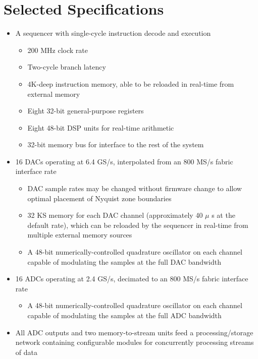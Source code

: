 \section{Selected Specifications}

\begin{itemize}

    \item A sequencer with single-cycle instruction decode and execution
    \begin{itemize}
        \item 200 MHz clock rate
        \item Two-cycle branch latency
        \item 4K-deep instruction memory, able to be reloaded in real-time from external memory
        \item Eight 32-bit general-purpose registers
        \item Eight 48-bit DSP units for real-time arithmetic
        \item 32-bit memory bus for interface to the rest of the system
    \end{itemize}

    \item 16 DACs operating at 6.4 GS/s, interpolated from an 800 MS/s fabric interface rate
    \begin{itemize}
        \item DAC sample rates may be changed without firmware change to allow optimal placement of Nyquist zone boundaries
        \item 32 KS memory for each DAC channel (approximately 40 $\mu$ s at the default rate), which can be reloaded by the sequencer in real-time from multiple external memory sources
        \item A 48-bit numerically-controlled quadrature oscillator on each channel capable of modulating the samples at the full DAC bandwidth
    \end{itemize}

    \item 16 ADCs operating at 2.4 GS/s, decimated to an 800 MS/s fabric interface rate
    \begin{itemize}
        \item A 48-bit numerically-controlled quadrature oscillator on each channel capable of modulating the samples at the full ADC bandwidth
    \end{itemize}

    \item All ADC outputs and two memory-to-stream units feed a processing/storage network containing configurable modules for concurrently processing streams of data


\end{itemize}
